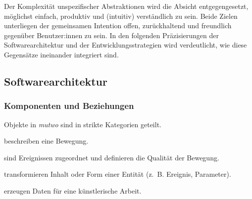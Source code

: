 \documentclass[12pt,a4paper,ngerman]{article}
\begin{document}
Der Komplexität unspezifischer Abstraktionen wird die Absicht entgegengesetzt, möglichst einfach, produktiv und (intuitiv) verständlich zu sein.
Beide Zielen unterliegen der gemeinsamen Intention offen, zurückhaltend und freundlich gegenüber Benutzer:innen zu sein.
In den folgenden Präzisierungen der Softwarearchitektur und der Entwicklungsstrategien wird verdeutlicht, wie diese Gegensätze ineinander integriert sind.








\subsection{Softwarearchitektur}

\subsubsection{Komponenten und Beziehungen}

Objekte in \emph{mutwo} sind in strikte Kategorien geteilt.

\bigskip

\hspace{0.5cm}
\begin{minipage}{0.95\textwidth}
    \begin{description}[style=multiline, leftmargin=2.25cm, font=\normalfont\emph]
        \item[Ereignisse] beschreiben eine Bewegung.
        \item[Parameter] sind Ereignissen zugeordnet und definieren die Qualität der Bewegung.
        \item[Übersetzer] transformieren Inhalt oder Form einer Entität (z.~B. Ereignis, Parameter).
        \item[Generatoren] erzeugen Daten für eine künstlerische Arbeit.
    \end{description}
\end{minipage}
\end{document}
